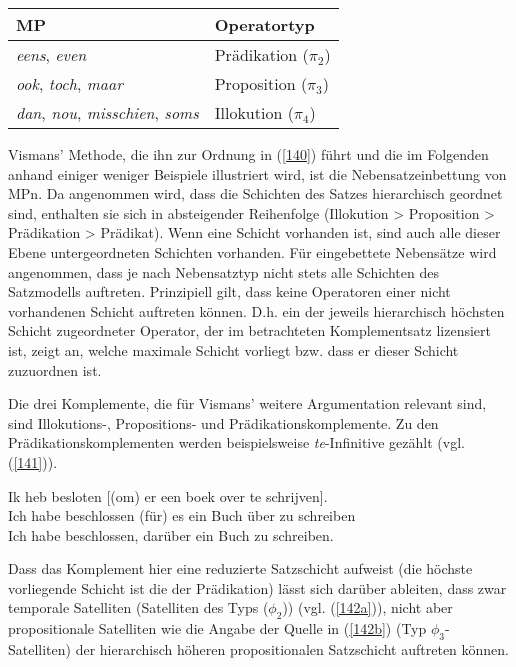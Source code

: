 \begin{exe}
	\ex\label{140}
	\begin{tabular}[t]{|l|l|}
	\hline
  	MP & Operatortyp\\
  	\hline
  	\textit{eens}, \textit{even} & Prädikation ($\pi_{\textrm{2}}$)\\
  	\hline
  	\textit{ook}, \textit{toch}, \textit{maar} & Proposition ($\pi_{\textrm{3}}$)\\
  	\hline
	\textit{dan}, \textit{nou}, \textit{misschien}, \textit{soms} & Illokution ($\pi_{\textrm{4}}$)\\  	
	\hline
\end{tabular}
\end{exe}
Vismans' Methode, die ihn zur Ordnung in (\ref{140}) führt und die im Folgenden anhand einiger weniger Beispiele illustriert wird, ist die Nebensatzeinbettung von MPn. Da angenommen wird, dass die Schichten des Satzes hierarchisch geordnet sind, enthalten sie sich in absteigender Reihenfolge (Illokution > Proposition > Prädikation > Prädikat). Wenn eine Schicht vorhanden ist, sind auch alle dieser Ebene untergeordneten Schichten vorhanden. Für eingebettete Nebensätze wird angenommen, dass je nach Nebensatztyp nicht stets alle Schichten des Satzmo\-dells auftreten. Prinzipiell gilt, dass keine Operatoren einer nicht vorhandenen Schicht auftreten können. D.h. ein der jeweils hierarchisch höchsten Schicht zugeordneter Operator, der im betrachteten Komplementsatz lizensiert ist, zeigt an, welche maximale Schicht vorliegt bzw. dass er dieser Schicht zuzuordnen ist. 

Die drei Komplemente, die für Vismans' weitere Argumentation relevant sind, sind Illokutions-, Propositions- und Prädikationskomplemente. Zu den Prädikationskomplementen  werden  beispielsweise \textit{te}-Infinitive  gezählt (vgl. (\ref{141})).

\begin{exe}
	\ex\label{141}
	\gll Ik heb besloten [(om) er een boek over te schrijven].\\
	Ich habe beschlossen (für) es ein Buch über zu schreiben\\
	\glt Ich habe beschlossen, darüber ein Buch zu schreiben.
	\newline
	\hbox{}\hfill\hbox {\citet[152]{Vismans1994}}	
\end{exe}
Dass das Komplement hier eine reduzierte Satzschicht aufweist (die höchste vorliegende Schicht ist die der Prädikation) lässt sich darüber ableiten, dass zwar temporale Satelliten  (Satelliten des Typs ($\phi_{\textrm{2}}$)) (vgl. (\ref{142a})), nicht aber propositionale Satelliten wie die Angabe der Quelle in (\ref{142b}) (Typ $\phi_{\textrm{3}}$-Satelliten) der hierarchisch höheren propositionalen Satzschicht auftreten können.

